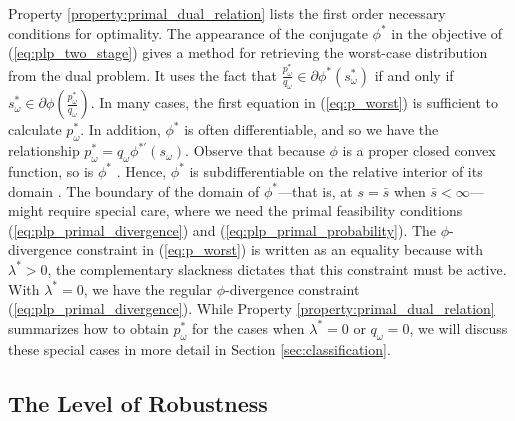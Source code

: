 \documentclass[opre,nonblindrev]{informs3} %
\begin{document}
Property \ref{property:primal_dual_relation} lists the first order necessary conditions for optimality. 
The appearance of the conjugate $\phi^*$ in the objective of (\ref{eq:plp_two_stage}) gives a method for retrieving the worst-case distribution from the dual problem.
It uses the fact that $\frac{p^*_\omega}{q_\omega} \in \partial \phi^*(s^*_\omega)$ if and only if $s^*_\omega \in \partial \phi\left(\frac{p^*_\omega}{q_\omega}\right)$.
In many cases, the first equation in (\ref{eq:p_worst}) is sufficient to calculate $p_\omega^*$.
In addition, $\phi^*$ is often differentiable, and so we have the relationship $p_\omega^* = q_\omega \phi^{* \prime}(s_\omega)$. 
Observe that because  $\phi$ is a proper closed convex function, so is $\phi^*$ \citep[Theorem 12.2]{rockafellar_70}.
Hence,  $\phi^*$ is subdifferentiable on the relative interior of its domain \citep[Theorem 23.4]{rockafellar_70}.  
The boundary of the domain of $\phi^*$---that is, at $s=\bar{s}$ when $\bar{s}<\infty$---might require special care, where we need the primal feasibility conditions (\ref{eq:plp_primal_divergence}) and (\ref{eq:plp_primal_probability}). 
The $\phi$-divergence constraint in (\ref{eq:p_worst}) is written as an equality because with $\lambda^*>0$, the complementary slackness dictates that this constraint must be active. 
With $\lambda^*=0$, we have the regular $\phi$-divergence constraint (\ref{eq:plp_primal_divergence}). 
While Property \ref{property:primal_dual_relation} summarizes how to obtain $p^*_\omega$ for the cases when $\lambda^* = 0$ or $q_\omega = 0$, we will discuss these special cases in more detail in Section \ref{sec:classification}.


\subsection{The Level of Robustness}
\label{ssec:robust_level}
\end{document}
